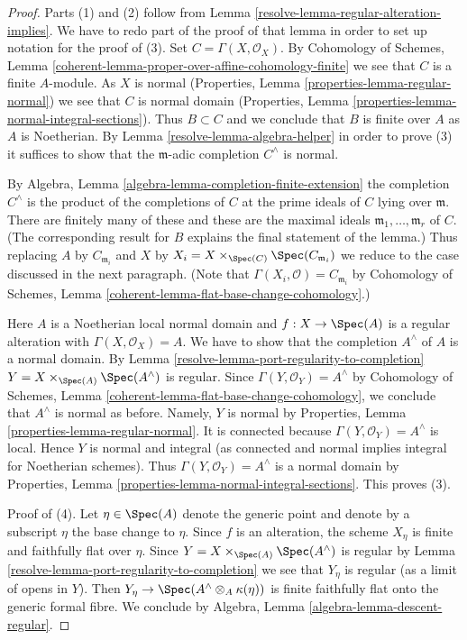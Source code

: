 \begin{proof}

Parts (1) and (2) follow from Lemma \ref{resolve-lemma-regular-alteration-implies}.
We have to redo part of the proof of that lemma in order to set up notation
for the proof of (3). Set $C = \Gamma(X, \mathcal{O}_X)$. By
Cohomology of Schemes, Lemma
\ref{coherent-lemma-proper-over-affine-cohomology-finite}
we see that $C$ is a finite $A$-module. As $X$ is normal
(Properties, Lemma \ref{properties-lemma-regular-normal})
we see that $C$ is normal domain
(Properties, Lemma \ref{properties-lemma-normal-integral-sections}).
Thus $B \subset C$ and we conclude that $B$ is finite over $A$
as $A$ is Noetherian. By Lemma \ref{resolve-lemma-algebra-helper}
in order to prove (3) it suffices to show
that the $\mathfrak m$-adic completion $C^\wedge$ is normal.

\medskip\noindent
By Algebra, Lemma \ref{algebra-lemma-completion-finite-extension}
the completion $C^\wedge$ is the product of the completions of
$C$ at the prime ideals of $C$ lying over $\mathfrak m$.
There are finitely many of these and these are the maximal
ideals $\mathfrak m_1, \ldots, \mathfrak m_r$ of $C$.
(The corresponding result for $B$ explains the final statement of the lemma.)
Thus replacing $A$ by $C_{\mathfrak m_i}$ and $X$ by
$X_i = X \times_{\Spec(C)} \Spec(C_{\mathfrak m_i})$
we reduce to the case discussed in the next paragraph.
(Note that $\Gamma(X_i, \mathcal{O}) = C_{\mathfrak m_i}$ by
Cohomology of Schemes, Lemma \ref{coherent-lemma-flat-base-change-cohomology}.)

\medskip\noindent
Here $A$ is a Noetherian local normal domain and $f : X \to \Spec(A)$ is a
regular alteration with $\Gamma(X, \mathcal{O}_X) = A$.
We have to show that the completion $A^\wedge$
of $A$ is a normal domain. By
Lemma \ref{resolve-lemma-port-regularity-to-completion}
$Y = X \times_{\Spec(A)} \Spec(A^\wedge)$ is regular.
Since $\Gamma(Y, \mathcal{O}_Y) = A^\wedge$ by
Cohomology of Schemes, Lemma \ref{coherent-lemma-flat-base-change-cohomology},
we conclude that $A^\wedge$ is normal as before.
Namely, $Y$ is normal by
Properties, Lemma \ref{properties-lemma-regular-normal}.
It is connected because $\Gamma(Y, \mathcal{O}_Y) = A^\wedge$ is local.
Hence $Y$ is normal and integral (as connected and normal
implies integral for Noetherian schemes). Thus
$\Gamma(Y, \mathcal{O}_Y) = A^\wedge$
is a normal domain by
Properties, Lemma \ref{properties-lemma-normal-integral-sections}.
This proves (3).

\medskip\noindent
Proof of (4). Let $\eta \in \Spec(A)$ denote the generic point
and denote by a subscript $\eta$ the base change to $\eta$.
Since $f$ is an alteration, the scheme $X_\eta$ is finite and
faithfully flat over $\eta$. Since $Y = X \times_{\Spec(A)} \Spec(A^\wedge)$
is regular by Lemma \ref{resolve-lemma-port-regularity-to-completion}
we see that $Y_\eta$ is regular (as a limit of opens in $Y$).
Then $Y_\eta \to \Spec(A^\wedge \otimes_A \kappa(\eta))$ is finite
faithfully flat onto the generic formal fibre. We conclude by
Algebra, Lemma \ref{algebra-lemma-descent-regular}.
\end{proof}

